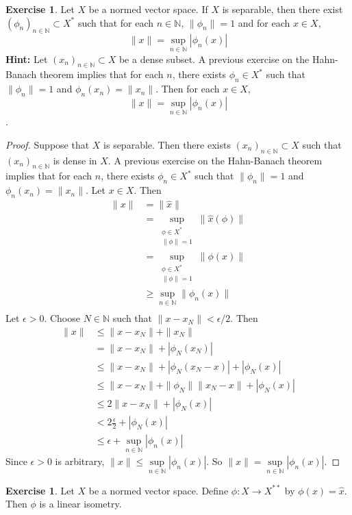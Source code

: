 \documentclass[12pt]{amsart}
\theoremstyle{definition}
\newtheorem{ex}[definition]{Exercise}
\newcommand{\ep}{\epsilon}
\newcommand{\N}{\mathbb{N}}
\newcommand{\tbf}[1]{\textbf{#1}}
\DeclareMathOperator*{\0}{\mbf{0}}
\DeclareMathOperator*{\1}{\mbf{1}}
\newcommand{\lex}[1]{\label{ex:#1}}
\begin{document}
	\begin{ex}
		Let $X$ be a normed vector space. If $X$ is separable, then there exist $(\phi_n)_{n \in \N} \subset X^*$ such that for each $n \in \N$, $\|\phi_n\| = 1$ and for each $x \in X$, 
		$$\|x\| = \sup_{n \in \N} |\phi_n(x)|$$  
		\tbf{Hint:} Let $(x_n)_{n \in \N} \subset X$ be a dense subset. A previous exercise on the Hahn-Banach theorem implies that for each $n$, there exists $\phi_n \in X^*$ such that $\|\phi_n\| = 1$ and $\phi_n(x_n) = \|x_n\|$. Then for each $x \in X$, $$\|x\| = \sup_{n \in \N} |\phi_n(x)|$$. 
	\end{ex}
	
	\begin{proof}
		Suppose that $X$ is separable. Then there exists $(x_n)_{n \in \N} \subset X$ such that $(x_n)_{n \in \N}$ is dense in $X$. A previous exercise on the Hahn-Banach theorem implies that for each $n$, there exists $\phi_n \in X^*$ such that $\|\phi_n\| = 1$ and $\phi_n(x_n) = \|x_n\|$. Let $x \in X$. Then 
		\begin{align*}
			\|x\| 
			&= \|\hat{x}\| \\
			&= \sup_{\substack{\phi \in X^* \\ \|\phi\| = 1}} \|\hat{x}(\phi)\| \\
			&= \sup_{\substack{\phi \in X^* \\ \|\phi\| = 1}} \|\phi(x)\| \\
			& \geq \sup_{n \in \N} \|\phi_n(x)\| \\
		\end{align*}
		Let $\ep > 0$. Choose $N \in \N$ such that $\|x - x_N\| < \ep/2$. Then
		\begin{align*}
			\|x\| 
			& \leq \|x - x_N\| + \|x_N\| \\
			& = \|x - x_N\| + |\phi_N(x_N)| \\
			& \leq \|x - x_N\| + |\phi_N(x_N - x)| + |\phi_N(x)| \\
			& \leq \|x - x_N\| + \|\phi_N\|\|x_N - x\| + |\phi_N(x)| \\
			& \leq 2\|x - x_N\| + |\phi_N(x)| \\
			& < 2 \frac{\ep}{2} +  |\phi_N(x)| \\
			& \leq \ep + \sup_{n \in \N} |\phi_n(x)|
		\end{align*}
		Since $\ep >0$ is arbitrary, $\|x\| \leq \sup\limits_{n \in \N} |\phi_n(x)|$. So $\|x\| = \sup\limits_{n \in \N} |\phi_n(x)|$.
	\end{proof}
	
	
	\begin{ex} \lex{}
		Let $X$ be a normed vector space. Define $\phi : X \rightarrow X^{**}$ by $\phi(x) = \hat{x}$. Then $\phi$ is a linear isometry. 
	\end{ex}
	
\end{document}
